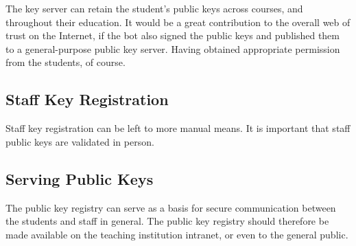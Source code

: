 The key server can retain the student's public keys across courses, and
throughout their education. It would be a great contribution to the overall web
of trust on the Internet, if the bot also signed the public keys and published
them to a general-purpose public key server. Having obtained appropriate
permission from the students, of course.

\subsection{Staff Key Registration}

Staff key registration can be left to more manual means. It is important that
staff public keys are validated in person.

\subsection{Serving Public Keys}

The public key registry can serve as a basis for secure communication between
the students and staff in general. The public key registry should therefore be
made available on the teaching institution intranet, or even to the general
public.

